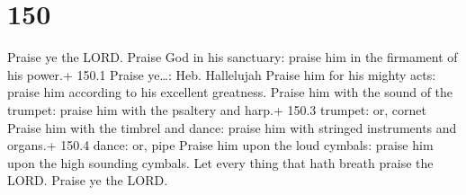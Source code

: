 \hypertarget{section-150}{%
\section{150}\label{section-150}}

 Praise ye the LORD. Praise God in his sanctuary: praise him
in the firmament of his power.+ 150.1 Praise ye\ldots: Heb. Hallelujah
 Praise him for his mighty acts: praise him according to his
excellent greatness.  Praise him with the sound of the
trumpet: praise him with the psaltery and harp.+ 150.3 trumpet: or,
cornet  Praise him with the timbrel and dance: praise him
with stringed instruments and organs.+ 150.4 dance: or, pipe
 Praise him upon the loud cymbals: praise him upon the high
sounding cymbals.  Let every thing that hath breath praise
the LORD. Praise ye the LORD.
